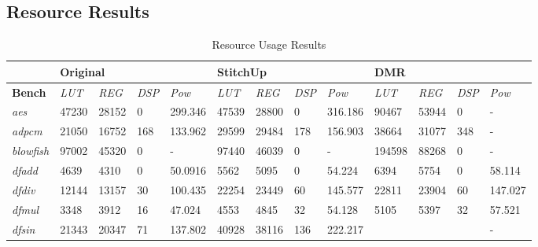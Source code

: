 \subsection{Resource Results}
\renewcommand{\arraystretch}{0.8}
\begin{table}[t]
\small
\singlespace
\centering
\caption{Resource Usage Results}
\label{tab:resources}
\tabcolsep=0.11cm
\begin{tabular}{@{}|l|l|l|l|l|l|l|l|l|l|l|l|l|@{}}
\toprule
                    & \multicolumn{4}{l|}{\textbf{Original}}                      & \multicolumn{4}{l|}{\textbf{StitchUp}}                      & \multicolumn{4}{l|}{\textbf{DMR}}                           \\ \midrule
\textbf{Bench}      & \textit{LUT} & \textit{REG} & \textit{DSP} & \textit{Pow}   & \textit{LUT} & \textit{REG} & \textit{DSP} & \textit{Pow}   & \textit{LUT} & \textit{REG} & \textit{DSP} & \textit{Pow}   \\ \midrule
\textit{aes}        & 47230        & 28152        & 0            & 299.346        & 47539        & 28800        & 0            & 316.186        & 90467        & 53944        & 0            & -              \\ \midrule
\textit{adpcm}      & 21050        & 16752        & 168          & 133.962        & 29599        & 29484        & 178          & 156.903        & 38664        & 31077        & 348          & -              \\ \midrule
\textit{blowfish}   & 97002        & 45320        & 0            & -              & 97440        & 46039        & 0            & -              & 194598       & 88268        & 0            & -              \\ \midrule
\textit{dfadd}      & 4639         & 4310         & 0            & 50.0916        & 5562         & 5095         & 0            & 54.224         & 6394         & 5754         & 0            & 58.114         \\ \midrule
\textit{dfdiv}      & 12144        & 13157        & 30           & 100.435        & 22254        & 23449        & 60           & 145.577        & 22811        & 23904        & 60           & 147.027        \\ \midrule
\textit{dfmul}      & 3348         & 3912         & 16           & 47.024         & 4553         & 4845         & 32           & 54.128         & 5105         & 5397         & 32           & 57.521         \\ \midrule
\textit{dfsin}      & 21343        & 20347        & 71           & 137.802        & 40928        & 38116        & 136          & 222.217        &              &              &              & -              \\ \midrule

\end{tabular}
\end{table}
